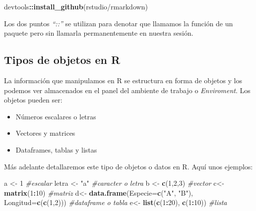 \documentclass[
]{book}
\newenvironment{Shaded}{\begin{snugshade}}{\end{snugshade}}
\newcommand{\AttributeTok}[1]{\textcolor[rgb]{0.13,0.29,0.53}{#1}}
\newcommand{\CommentTok}[1]{\textcolor[rgb]{0.56,0.35,0.01}{\textit{#1}}}
\newcommand{\DecValTok}[1]{\textcolor[rgb]{0.00,0.00,0.81}{#1}}
\newcommand{\FunctionTok}[1]{\textcolor[rgb]{0.13,0.29,0.53}{\textbf{#1}}}
\newcommand{\NormalTok}[1]{#1}
\newcommand{\OtherTok}[1]{\textcolor[rgb]{0.56,0.35,0.01}{#1}}
\newcommand{\SpecialCharTok}[1]{\textcolor[rgb]{0.81,0.36,0.00}{\textbf{#1}}}
\newcommand{\StringTok}[1]{\textcolor[rgb]{0.31,0.60,0.02}{#1}}
\begin{document}
\begin{Shaded}
\begin{Highlighting}[]
\NormalTok{devtools}\SpecialCharTok{::}\FunctionTok{install\_github}\NormalTok{(}\StringTok{\textquotesingle{}rstudio/rmarkdown\textquotesingle{}}\NormalTok{)}
\end{Highlighting}
\end{Shaded}

Los dos puntos \emph{``::''} se utilizan para denotar que llamamos la función de un paquete pero sin llamarla permanentemente en nuestra sesión.

\subsection{Tipos de objetos en R}\label{tipos-de-objetos-en-r}

La información que manipulamos en R se estructura en forma de objetos y los podemos ver almacenados en el panel del ambiente de trabajo o \emph{Enviroment}.
Los objetos pueden ser:

\begin{itemize}
\item
  Números escalares o letras
\item
  Vectores y matrices
\item
  Dataframes, tablas y listas
\end{itemize}

Más adelante detallaremos este tipo de objetos o datos en R.
Aquí unos ejemplos:

\begin{Shaded}
\begin{Highlighting}[]
\NormalTok{a }\OtherTok{\textless{}{-}} \DecValTok{1}                                                          \CommentTok{\#escalar}
\NormalTok{letra }\OtherTok{\textless{}{-}} \StringTok{"a"}                                                    \CommentTok{\#caracter o letra}
\NormalTok{b }\OtherTok{\textless{}{-}} \FunctionTok{c}\NormalTok{(}\DecValTok{1}\NormalTok{,}\DecValTok{2}\NormalTok{,}\DecValTok{3}\NormalTok{)                                                   }\CommentTok{\#vector}
\NormalTok{c}\OtherTok{\textless{}{-}} \FunctionTok{matrix}\NormalTok{(}\DecValTok{1}\SpecialCharTok{:}\DecValTok{10}\NormalTok{)                                                }\CommentTok{\#matriz}
\NormalTok{d}\OtherTok{\textless{}{-}} \FunctionTok{data.frame}\NormalTok{(}\AttributeTok{Especie=}\FunctionTok{c}\NormalTok{(}\StringTok{"A"}\NormalTok{, }\StringTok{"B"}\NormalTok{), }\AttributeTok{Longitud=}\FunctionTok{c}\NormalTok{(}\FunctionTok{c}\NormalTok{(}\DecValTok{1}\NormalTok{,}\DecValTok{2}\NormalTok{)))         }\CommentTok{\#dataframe o tabla}
\NormalTok{e}\OtherTok{\textless{}{-}} \FunctionTok{list}\NormalTok{(}\FunctionTok{c}\NormalTok{(}\DecValTok{1}\SpecialCharTok{:}\DecValTok{20}\NormalTok{), }\FunctionTok{c}\NormalTok{(}\DecValTok{1}\SpecialCharTok{:}\DecValTok{10}\NormalTok{))                                      }\CommentTok{\#lista}
\end{Highlighting}
\end{Shaded}
\end{document}
